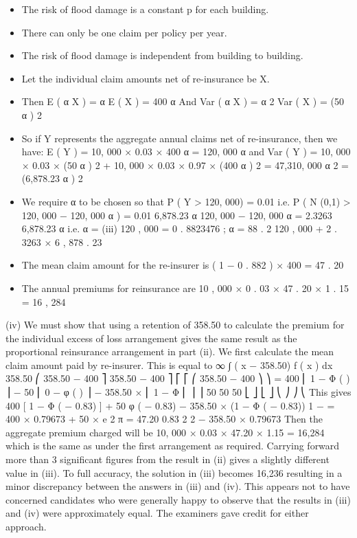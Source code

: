 \documentclass[a4paper,12pt]{article}
\begin{document}
\begin{itemize}
\item The risk of flood damage is a constant p for each building.
\item There can only be one claim per policy per year.
\item The risk of flood damage is independent from building to building.
\item Let the individual claim amounts net of re-insurance be X. 
\item Then
E ( α X ) = α E ( X ) = 400 α
And Var ( α X ) = α 2 Var ( X ) = (50 α ) 2
\item So if Y represents the aggregate annual claims net of re-insurance, then we
have:
E ( Y ) = 10, 000 × 0.03 × 400 α = 120, 000 α
and
Var ( Y ) = 10, 000 × 0.03 × (50 α ) 2 + 10, 000 × 0.03 × 0.97 × (400 α ) 2 = 47,310, 000 α 2
= (6,878.23 α ) 2
\item We require α to be chosen so that
P ( Y > 120, 000) = 0.01
i.e. P ( N (0,1) >
120, 000 − 120, 000 α
) = 0.01
6,878.23 α
120, 000 − 120, 000 α
= 2.3263
6,878.23 α
i.e. α =
(iii)
120 , 000
= 0 . 8823476 ; α = 88 . 2 %
120 , 000 + 2 . 3263 × 6 , 878 . 23
\item The mean claim amount for the re-insurer is ( 1 − 0 . 882 ) × 400 = 47 . 20
\item The annual premiums for reinsurance are 10 , 000 × 0 . 03 × 47 . 20 × 1 . 15 = 16 , 284
\end{itemize}
(iv)
We must show that using a retention of 358.50 to calculate the premium for the individual excess of loss arrangement gives the same result as the proportional reinsurance arrangement in part (ii).
We first calculate the mean claim amount paid by re-insurer. This is equal to
∞
∫
( x − 358.50) f ( x ) dx
358.50
⎛
358.50 − 400 ⎤
358.50 − 400 ⎤
⎡
⎡
⎛ 358.50 − 400 ⎞ ⎞
= 400 ⎢ 1 − Φ (
) ⎥ − 50 ⎢ 0 − φ (
) ⎥ − 358.50 × ⎜ 1 − Φ ⎜
⎟ ⎟
50
50
50
⎣
⎦
⎣
⎦
⎝
⎠ ⎠
⎝
This gives
400 [ 1 − Φ ( − 0.83) ] + 50 φ ( − 0.83) − 358.50 × (1 − Φ ( − 0.83))
1 −
= 400 × 0.79673 + 50 ×
e
2 π
= 47.20
0.83 2
2
− 358.50 × 0.79673
Then the aggregate premium charged will be 10, 000 × 0.03 × 47.20 × 1.15 =
16,284 which is the same as under the first arrangement as required.
Carrying forward more than 3 significant figures from the result in (ii) gives a slightly
different value in (iii). To full accuracy, the solution in (iii) becomes 16,236 resulting in a
minor discrepancy between the answers in (iii) and (iv). This appears not to have concerned
candidates who were generally happy to observe that the results in (iii) and (iv) were
approximately equal. The examiners gave credit for either approach.

\end{document}
